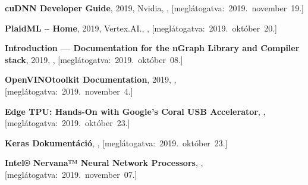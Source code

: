 \begin{thebibliography}{9}

	\textbf{cuDNN Developer Guide},
	2019,
	Nvidia,
	,
	\mbox{[meglátogatva:~2019.~november~19.]}

	\textbf{PlaidML -- Home},
	2019,
	Vertex.AI.,
	,
	\mbox{[meglátogatva:~2019.~október~20.]}

	\textbf{Introduction --- Documentation for the {nGraph} Library and Compiler stack},
	2019,
	,
	\mbox{[meglátogatva:~2019.~október~08.]}

	\textbf{OpenVINO\textsuperscript{\texttrademark}\space toolkit Documentation},
	2019,
	,
	\mbox{[meglátogatva:~2019.~november~4.]}


	\textbf{Edge TPU: Hands-On with Google’s Coral USB Accelerator},
	,
	\mbox{[meglátogatva:~2019.~október~23.]}

	\textbf{Keras Dokumentáció},
	,
	\mbox{[meglátogatva:~2019.~október~23.]}

	\textbf{Intel® Nervana™ Neural Network Processors},
	,
	\mbox{[meglátogatva:~2019.~november~07.]}




\end{thebibliography}
